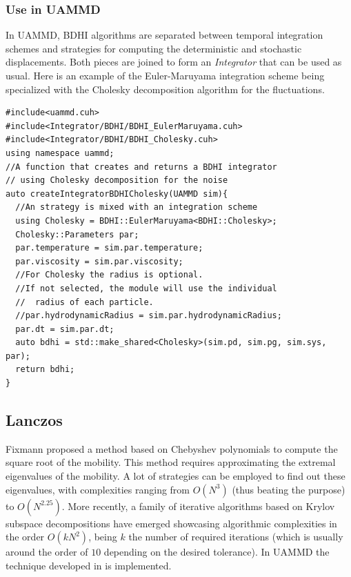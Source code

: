 \documentclass[ twoside,openright,titlepage,numbers=noenddot,%
headinclude,footinclude,cleardoublepage=empty,abstract=on,
BCOR=5mm,paper=a4,fontsize=11pt, dvipsnames
]{scrreprt}
\def\ucpp{uammd_cpp_lexer.py:UAMMDCppLexer -x}
\newcommand{\uammd}{\gls{UAMMD}\xspace}
\begin{document}
\subsubsection{Use in UAMMD}\label{sec:uammdchol}
In \uammd, \gls{BDHI} algorithms are separated between temporal integration schemes and strategies for computing the deterministic and stochastic displacements. Both pieces are joined to form an \emph{Integrator} that can be used as usual.
Here is an example of the Euler-Maruyama integration scheme being specialized with the Cholesky decomposition algorithm for the fluctuations.
\begin{verbatim}
#include<uammd.cuh>
#include<Integrator/BDHI/BDHI_EulerMaruyama.cuh>
#include<Integrator/BDHI/BDHI_Cholesky.cuh>
using namespace uammd;
//A function that creates and returns a BDHI integrator
// using Cholesky decomposition for the noise
auto createIntegratorBDHICholesky(UAMMD sim){   
  //An strategy is mixed with an integration scheme
  using Cholesky = BDHI::EulerMaruyama<BDHI::Cholesky>;
  Cholesky::Parameters par;
  par.temperature = sim.par.temperature;
  par.viscosity = sim.par.viscosity;
  //For Cholesky the radius is optional.
  //If not selected, the module will use the individual 
  //  radius of each particle.
  //par.hydrodynamicRadius = sim.par.hydrodynamicRadius;
  par.dt = sim.par.dt;
  auto bdhi = std::make_shared<Cholesky>(sim.pd, sim.pg, sim.sys, par);
  return bdhi;
}
\end{verbatim}


\subsection{Lanczos}
Fixmann proposed a method based on Chebyshev polynomials\cite{Fixman1986} to compute the square root of the mobility. This method requires approximating the extremal eigenvalues of the mobility. A lot of strategies can be employed to find out these eigenvalues, with complexities ranging from $O(N^3)$ (thus beating the purpose) to $O(N^{2.25})$\cite{Jendrejack2000}. More recently, a family of iterative algorithms based on Krylov subspace decompositions have emerged\cite{Ando2012,Saadat2014} showcasing algorithmic complexities in the order $O(kN^2)$, being $k$ the number of required iterations (which is usually around the order of $10$ depending on the desired tolerance). In \uammd the technique developed in \cite{Ando2012} is implemented.

\end{document}
